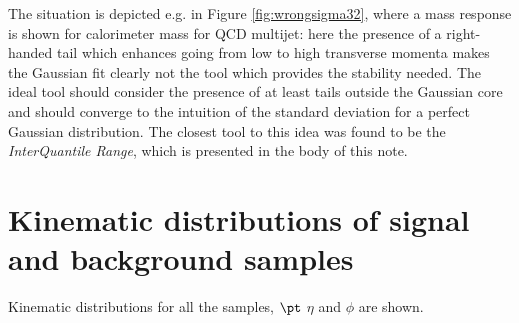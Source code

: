 The situation is depicted e.g. in Figure \ref{fig:wrongsigma32}, where a mass response is shown for calorimeter mass for QCD multijet: here the presence of a right-handed tail which enhances going from low to high transverse momenta makes the Gaussian fit clearly not the tool which provides the stability needed. The ideal tool should consider the presence of at least tails outside the Gaussian core and should converge to the intuition of the standard deviation for a perfect Gaussian distribution.
The closest tool to this idea was found to be the \textit{InterQuantile Range}, which is presented in the body of this note.


\section{Kinematic distributions of signal and background samples}\label{sec:kinematic}
Kinematic distributions for all the samples, $\pt$ $\eta$ and $\phi$ are shown.

